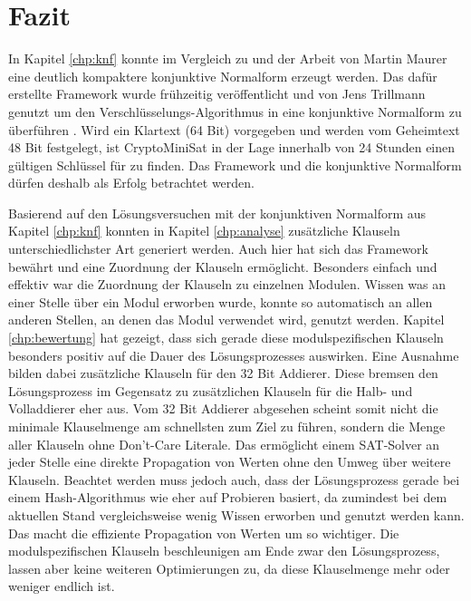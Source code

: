 \chapter{Fazit}
\label{chp:fazit}

In Kapitel \ref{chp:knf} konnte im Vergleich zu  und der Arbeit von Martin Maurer eine deutlich kompaktere konjunktive Normalform erzeugt werden.
Das dafür erstellte Framework wurde frühzeitig veröffentlicht und von Jens Trillmann genutzt um den Verschlüsselungs-Algorithmus  in eine
konjunktive Normalform zu überführen \cite{trillmann}. Wird ein Klartext (64 Bit) vorgegeben und werden vom Geheimtext 48 Bit festgelegt, ist CryptoMiniSat
in der Lage innerhalb von 24 Stunden einen gültigen Schlüssel für  zu finden. Das Framework und die konjunktive Normalform dürfen deshalb als
Erfolg betrachtet werden.

Basierend auf den Lösungsversuchen mit der konjunktiven Normalform aus Kapitel \ref{chp:knf} konnten in Kapitel \ref{chp:analyse} zusätzliche Klauseln
unterschiedlichster Art generiert werden. Auch hier hat sich das Framework bewährt und eine Zuordnung der Klauseln ermöglicht. Besonders einfach und
effektiv war die Zuordnung der Klauseln zu einzelnen Modulen. Wissen was an einer Stelle über ein Modul erworben wurde, konnte so automatisch an allen
anderen Stellen, an denen das Modul verwendet wird, genutzt werden. Kapitel \ref{chp:bewertung} hat gezeigt, dass sich gerade diese modulspezifischen
Klauseln besonders positiv auf die Dauer des Lösungsprozesses auswirken. Eine Ausnahme bilden dabei zusätzliche Klauseln für den 32 Bit Addierer. Diese
bremsen den Lösungsprozess im Gegensatz zu zusätzlichen Klauseln für die Halb- und Volladdierer eher aus. Vom 32 Bit Addierer abgesehen scheint somit
nicht die minimale Klauselmenge am schnellsten zum Ziel zu führen, sondern die Menge aller Klauseln ohne Don't-Care Literale. Das ermöglicht einem
SAT-Solver an jeder Stelle eine direkte Propagation von Werten ohne den Umweg über weitere Klauseln. Beachtet werden muss jedoch auch, dass der
Lösungsprozess gerade bei einem Hash-Algorithmus wie  eher auf Probieren basiert, da zumindest bei dem aktuellen Stand vergleichsweise
wenig Wissen erworben und genutzt werden kann. Das macht die effiziente Propagation von Werten um so wichtiger. Die modulspezifischen Klauseln
beschleunigen am Ende zwar den Lösungsprozess, lassen aber keine weiteren Optimierungen zu, da diese Klauselmenge mehr oder weniger endlich ist.

